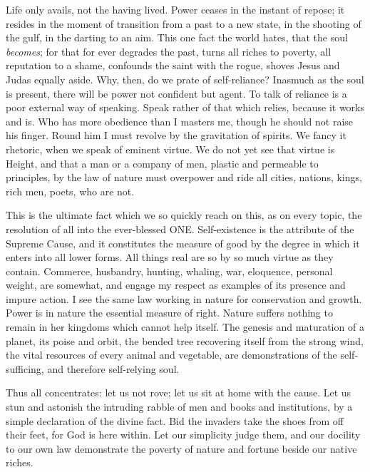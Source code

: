 \documentclass[12pt]{article}
\begin{document}
Life only avails, not the having lived. Power ceases in the instant of
repose; it resides in the moment of transition from a past to a new state,
in the shooting of the gulf, in the darting to an aim. This one fact the
world hates, that the soul {\it becomes}; for that for ever degrades the past,
turns all riches to poverty, all reputation to a shame, confounds the saint
with the rogue, shoves Jesus and Judas equally aside. Why, then, do we prate
of self-reliance? Inasmuch as the soul is present, there will be power not
confident but agent. To talk of reliance is a poor external way of speaking.
Speak rather of that which relies, because it works and is. Who has more
obedience than I masters me, though he should not raise his finger. Round
him I must revolve by the gravitation of spirits. We fancy it rhetoric, when
we speak of eminent virtue. We do not yet see that virtue is Height, and
that a man or a company of men, plastic and permeable to principles, by the
law of nature must overpower and ride all cities, nations, kings, rich men,
poets, who are not.

This is the ultimate fact which we so quickly reach on this, as on every
topic, the resolution of all into the ever-blessed ONE. Self-existence is
the attribute of the Supreme Cause, and it constitutes the measure of good
by the degree in which it enters into all lower forms. All things real are
so by so much virtue as they contain. Commerce, husbandry, hunting, whaling,
war, eloquence, personal weight, are somewhat, and engage my respect as
examples of its presence and impure action. I see the same law working in
nature for conservation and growth. Power is in nature the essential measure
of right. Nature suffers nothing to remain in her kingdoms which cannot help
itself. The genesis and maturation of a planet, its poise and orbit, the
bended tree recovering itself from the strong wind, the vital resources of
every animal and vegetable, are demonstrations of the self-sufficing, and
therefore self-relying soul.

Thus all concentrates: let us not rove; let us sit at home with the cause.
Let us stun and astonish the intruding rabble of men and books and
institutions, by a simple declaration of the divine fact. Bid the invaders
take the shoes from off their feet, for God is here within. Let our
simplicity judge them, and our docility to our own law demonstrate the
poverty of nature and fortune beside our native riches.
\end{document}
